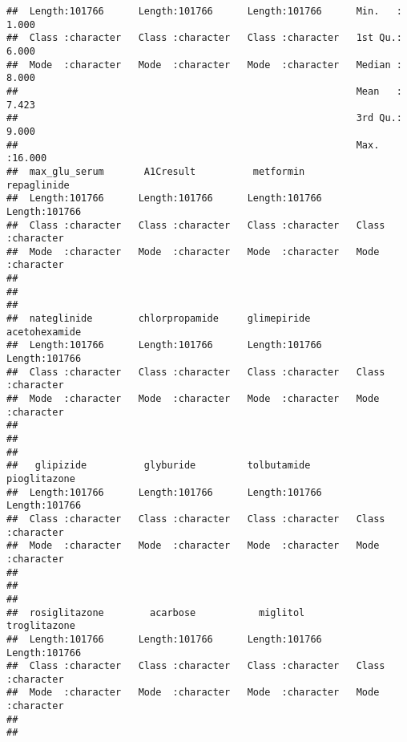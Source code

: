 \documentclass[
]{article}
\begin{document}
\begin{verbatim}
##  Length:101766      Length:101766      Length:101766      Min.   : 1.000  
##  Class :character   Class :character   Class :character   1st Qu.: 6.000  
##  Mode  :character   Mode  :character   Mode  :character   Median : 8.000  
##                                                           Mean   : 7.423  
##                                                           3rd Qu.: 9.000  
##                                                           Max.   :16.000  
##  max_glu_serum       A1Cresult          metformin         repaglinide       
##  Length:101766      Length:101766      Length:101766      Length:101766     
##  Class :character   Class :character   Class :character   Class :character  
##  Mode  :character   Mode  :character   Mode  :character   Mode  :character  
##                                                                             
##                                                                             
##                                                                             
##  nateglinide        chlorpropamide     glimepiride        acetohexamide     
##  Length:101766      Length:101766      Length:101766      Length:101766     
##  Class :character   Class :character   Class :character   Class :character  
##  Mode  :character   Mode  :character   Mode  :character   Mode  :character  
##                                                                             
##                                                                             
##                                                                             
##   glipizide          glyburide         tolbutamide        pioglitazone      
##  Length:101766      Length:101766      Length:101766      Length:101766     
##  Class :character   Class :character   Class :character   Class :character  
##  Mode  :character   Mode  :character   Mode  :character   Mode  :character  
##                                                                             
##                                                                             
##                                                                             
##  rosiglitazone        acarbose           miglitol         troglitazone      
##  Length:101766      Length:101766      Length:101766      Length:101766     
##  Class :character   Class :character   Class :character   Class :character  
##  Mode  :character   Mode  :character   Mode  :character   Mode  :character  
##                                                                             
##                                                                             

\end{verbatim}
\end{document}
